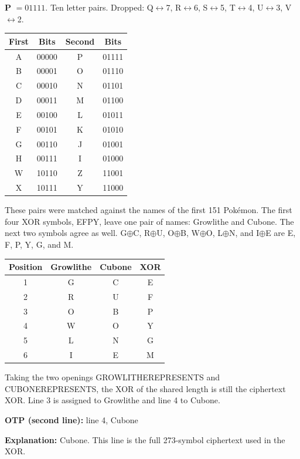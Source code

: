 \documentclass[12pt]{article}
\begin{document}
\begin{answer}
    \textbf{P} $=01111$. Ten letter pairs. Dropped: Q$\leftrightarrow$7, R$\leftrightarrow$6, S$\leftrightarrow$5, T$\leftrightarrow$4, U$\leftrightarrow$3, V$\leftrightarrow$2.

    \begin{center}
    \small
    \begin{tabular}{c c c c}
    \hline
    First & Bits & Second & Bits \\
    \hline
    A & 00000 & P & 01111 \\
    B & 00001 & O & 01110 \\
    C & 00010 & N & 01101 \\
    D & 00011 & M & 01100 \\
    E & 00100 & L & 01011 \\
    F & 00101 & K & 01010 \\
    G & 00110 & J & 01001 \\
    H & 00111 & I & 01000 \\
    W & 10110 & Z & 11001 \\
    X & 10111 & Y & 11000 \\
    \hline
    \end{tabular}
    \end{center}

    These pairs were matched against the names of the first 151 Pok{\'e}mon. The first four XOR symbols, EFPY, leave one pair of names: Growlithe and Cubone. The next two symbols agree as well. G$\oplus$C, R$\oplus$U, O$\oplus$B, W$\oplus$O, L$\oplus$N, and I$\oplus$E are E, F, P, Y, G, and M.

    \begin{center}
    \small
    \begin{tabular}{c c c c}
    \hline
    Position & Growlithe & Cubone & XOR \\
    \hline
    1 & G & C & E \\
    2 & R & U & F \\
    3 & O & B & P \\
    4 & W & O & Y \\
    5 & L & N & G \\
    6 & I & E & M \\
    \hline
    \end{tabular}
    \end{center}

    Taking the two openings GROWLITHEREPRESENTS and CUBONEREPRESENTS, the XOR of the shared length is still the ciphertext XOR. Line 3 is assigned to Growlithe and line 4 to Cubone.

    \bigskip
    \textbf{OTP (second line):} line 4, Cubone

    \textbf{Explanation:}
    Cubone. This line is the full 273-symbol ciphertext used in the XOR.
\end{answer}
\end{document}
